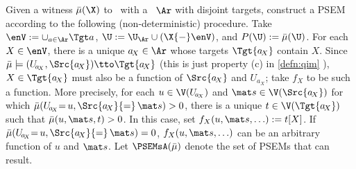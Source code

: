 
\begin{constr}
        \label{constr:PSEMs}
    Given a witness $\bar\mu(\X)$ to \cibility\ with
    a \hgraph\ $\Ar$ with disjoint targets,
    construct a PSEM according to the 
    following (non-deterministic) procedure.  
    Take $\enV := \cup_{a \in \Ar} \Tgt a$,  $\U := \U_{\Ar} \cup (\X{-}\enV)$, and $P(\U) := \bar\mu(\U)$. 
For each $X \in \enV$, there is a unique $a_{\!X} \in \Ar$ whose targets $\Tgt {a_{\!X}}$ contain $X$. 
Since
$\bar\mu \models ( U_{\!a_{\!X}}, \Src{a_{\!X}}) \tto \Tgt {a_{\!X}}$ 
(this is just property (c) in
\cref{defn:qim}%
 ),
$X \in \Tgt {a_{\!X}}$ must also be 
a function of $\Src{a_{\!X}}$ and $U_{\!a_{\!X}}$;
take $f_X$ to be such a function. 
More precisely,
for each $u \in \V (U_{\!a_{\!X}})$ and $\mat s \in \V (\Src {a_{\!X}})$
for which $\bar\mu(U_{\!a_{\!X}} {=}\, u, \Src {a_{\!X}} {=}\, \mat s) > 0$,
there is a unique
$t \in \V (\Tgt {a_{\!X}})$ such that $\bar\mu(u,\mat s, t) > 0$.
In this case, set $f_X(u, \mat s, \ldots) := t[X]$.
If $\bar\mu(U_{\!a_{\!X}} {=}\, u, \Src {a_{\!X}} {=}\, \mat s) = 0$, 
$f_X(u, \mat s, \ldots)$ can be an arbitrary function of $u$ and $\mat s$.
Let $\PSEMsA(\bar\mu)$ denote the set of PSEMs that can result.
\end{constr}

